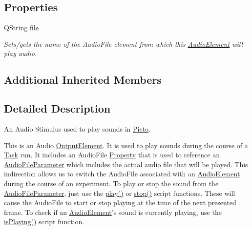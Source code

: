 \subsection*{Properties}
\begin{DoxyCompactItemize}
\item 
\hypertarget{class_picto_1_1_audio_element_a54db9990bab2a0c9f80fcf801091c3a5}{Q\-String \hyperlink{class_picto_1_1_audio_element_a54db9990bab2a0c9f80fcf801091c3a5}{file}}\label{class_picto_1_1_audio_element_a54db9990bab2a0c9f80fcf801091c3a5}

\begin{DoxyCompactList}\small\item\em Sets/gets the name of the Audio\-File element from which this \hyperlink{class_picto_1_1_audio_element}{Audio\-Element} will play audio. \end{DoxyCompactList}\end{DoxyCompactItemize}
\subsection*{Additional Inherited Members}


\subsection{Detailed Description}
An Audio Stimulus used to play sounds in \hyperlink{namespace_picto}{Picto}. 

This is an Audio \hyperlink{class_picto_1_1_output_element}{Output\-Element}. It is used to play sounds during the course of a \hyperlink{class_picto_1_1_task}{Task} run. It includes an Audio\-File \hyperlink{class_picto_1_1_property}{Property} that is used to reference an \hyperlink{class_picto_1_1_audio_file_parameter}{Audio\-File\-Parameter} which includes the actual audio file that will be played. This indirection allows us to switch the Audio\-File associated with an \hyperlink{class_picto_1_1_audio_element}{Audio\-Element} during the course of an experiment. To play or stop the sound from the \hyperlink{class_picto_1_1_audio_file_parameter}{Audio\-File\-Parameter}, just use the \hyperlink{class_picto_1_1_audio_element_a7f0539817be5838b8f5208d3e3e1030c}{play()} or \hyperlink{class_picto_1_1_audio_element_a9960f41ed8077abd3efed9a71c84926b}{stop()} script functions. These will cause the Audio\-File to start or stop playing at the time of the next presented frame. To check if an \hyperlink{class_picto_1_1_audio_element}{Audio\-Element}'s sound is currently playing, use the \hyperlink{class_picto_1_1_audio_element_abd8ca491891c38bc24c9b43dee687640}{is\-Playing()} script function.

